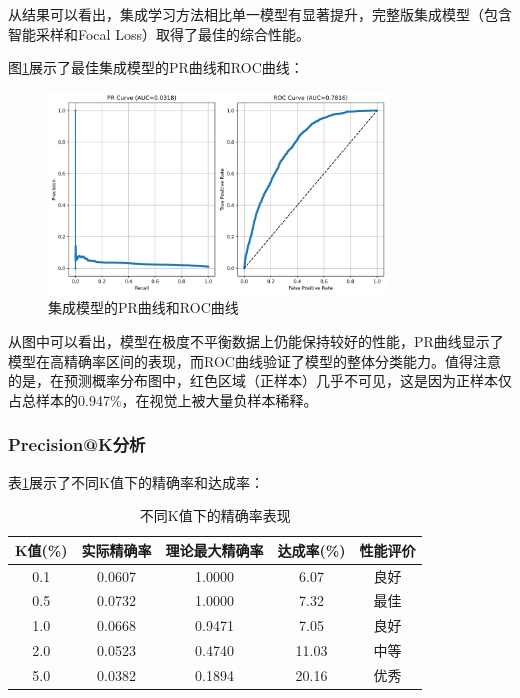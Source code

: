 \documentclass[12pt,a4paper]{article}
\begin{document}
从结果可以看出，集成学习方法相比单一模型有显著提升，完整版集成模型（包含智能采样和Focal Loss）取得了最佳的综合性能。

图\ref{fig:pr_roc_curves}展示了最佳集成模型的PR曲线和ROC曲线：

\begin{figure}[H]
\centering
\includegraphics[width=0.8\textwidth]{pr_roc_curves_20250615_143931.png}
\caption{集成模型的PR曲线和ROC曲线}
\label{fig:pr_roc_curves}
\end{figure}

从图中可以看出，模型在极度不平衡数据上仍能保持较好的性能，PR曲线显示了模型在高精确率区间的表现，而ROC曲线验证了模型的整体分类能力。值得注意的是，在预测概率分布图中，红色区域（正样本）几乎不可见，这是因为正样本仅占总样本的0.947\%，在视觉上被大量负样本稀释。

\subsubsection{Precision@K分析}

表\ref{fig:precision_k}展示了不同K值下的精确率和达成率：

\begin{table}[H]
\centering
\caption{不同K值下的精确率表现}
\label{fig:precision_k}
\begin{tabular}{ccccc}
\toprule
K值(\%) & 实际精确率 & 理论最大精确率 & 达成率(\%) & 性能评价 \\
\midrule
0.1 & 0.0607 & 1.0000 & 6.07 & 良好 \\
0.5 & 0.0732 & 1.0000 & 7.32 & 最佳 \\
1.0 & 0.0668 & 0.9471 & 7.05 & 良好 \\
2.0 & 0.0523 & 0.4740 & 11.03 & 中等 \\
5.0 & 0.0382 & 0.1894 & 20.16 & 优秀 \\
\bottomrule
\end{tabular}
\end{table}
\end{document}

